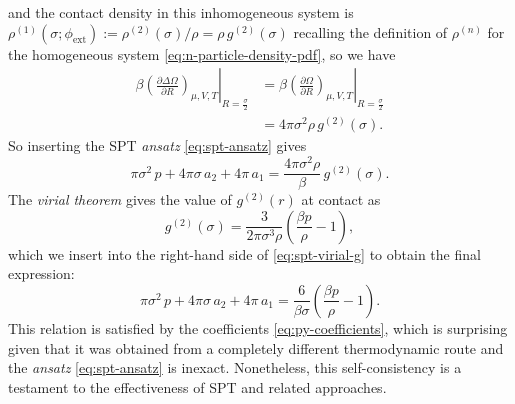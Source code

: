 \documentclass[11pt,twoside]{report}
\begin{document}
and the contact density in this inhomogeneous system is $\rho^{(1)}(\sigma; \phi_\mathrm{ext}) := \rho^{(2)}(\sigma)/\rho = \rho \, g^{(2)}(\sigma)$ recalling the definition of $\rho^{(n)}$ for the homogeneous system%
\eqref{eq:n-particle-density-pdf}, so we have
\begin{equation*}\label{eq:spt-contact-density}
  \begin{split}
    \left. \beta \left( \frac{\partial \Delta \Omega}{\partial R} \right)_{\mu,V,T}
    \right|_{R = \frac{\sigma}{2}}
    &=
    \left. \beta \left( \frac{\partial \Omega}{\partial R} \right)_{\mu,V,T}
    \right|_{R = \frac{\sigma}{2}}
    \\ &=
    4\pi \sigma^2 \rho \, g^{(2)}(\sigma).
  \end{split}
\end{equation*}
So inserting the SPT \emph{ansatz} \eqref{eq:spt-ansatz} gives
\begin{equation}\label{eq:spt-virial-g}
  \pi \sigma^2 \, p
  + 4\pi \sigma \, a_2
  + 4\pi \, a_1
  =
  \frac{4\pi \sigma^2 \rho}{\beta} \, g^{(2)}(\sigma).
\end{equation}
The \emph{virial theorem} gives the value of $g^{(2)}(r)$ at contact as \cite{Hansen2013}
\begin{equation}\label{eq:contact-g}
  g^{(2)}(\sigma) =
  \frac{3}{2\pi \sigma^3 \rho} \left( \frac{\beta p}{\rho} - 1 \right),
\end{equation}
which we insert into the right-hand side of \eqref{eq:spt-virial-g} to obtain the final expression:
\begin{equation}\label{eq:spt-virial}
  \pi \sigma^2 \, p
  + 4\pi \sigma \, a_2
  + 4\pi \, a_1
  =
  \frac{6}{\beta\sigma} \left( \frac{\beta p}{\rho} - 1 \right).
\end{equation}
This relation is satisfied by the coefficients \eqref{eq:py-coefficients}, which is surprising given that it was obtained from a completely different thermodynamic route and the \emph{ansatz} \eqref{eq:spt-ansatz} is inexact.
Nonetheless, this self-consistency is a testament to the effectiveness of SPT and related approaches.
\end{document}
